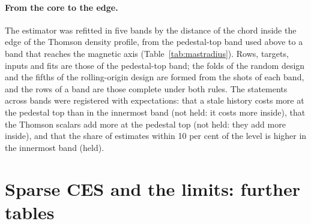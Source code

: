 \documentclass[11pt,a4paper]{article}
\begin{document}
\paragraph{From the core to the edge.} The estimator was refitted in five bands by the
distance of the chord inside the edge of the Thomson density profile, from the
pedestal-top band used above to a band that reaches the magnetic axis
(Table~\ref{tab:mastradius}). Rows, targets, inputs and fits are those of the pedestal-top
band; the folds of the random design and the fifths of the rolling-origin design are
formed from the shots of each band, and the rows of a band are those complete under both
rules. The statements across bands were registered with expectations: that a stale
history costs more at the pedestal top than in the innermost band (not held: it costs
more inside), that the Thomson scalars add more at the pedestal top (not held: they add
more inside), and that the share of estimates within 10 per cent of the level is higher
in the innermost band (held).

\begin{table}[tbp]
  \centering
  \caption{\CapMastRadius}
  \label{tab:mastradius}
  \TabMastRadius
\end{table}

\begin{table}[tbp]
  \centering
  \caption{\CapMastRadiusAcross}
  \label{tab:mastradiusacross}
  \TabMastRadiusAcross
\end{table}

\begin{table}[tbp]
  \centering
  \caption{MAST, pedestal-top band, target L5: RMSE by delay of the charge-exchange history under the random (M1) and the chronological design (M4), on the rows complete under all delays. TX adds the Thomson scalars of the same radius. RT multiplies the held value by the ratio of the Thomson $T_e$ at the present and at the anchor frame; RTa fits an exponent $\alpha$ and an offset to that ratio in logarithms.}
  \label{tab:mast}
  \TabMastRmse
\end{table}

\begin{table}[tbp]
  \centering
  \caption{\CapMastCost}
  \label{tab:mastcost}
  \TabMastCost
\end{table}

\section{Sparse CES and the limits: further tables}
\label{sec:slimits}
\end{document}
